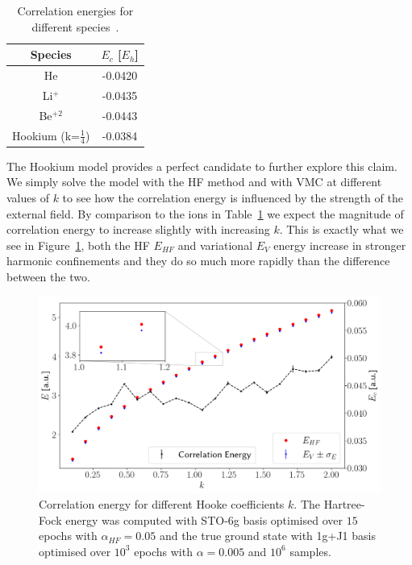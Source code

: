 \documentclass[final,3p,times,twocolumn]{elsarticle}
\begin{document}
	\begin{table}[h]
		\centering
		\begin{tabular}{@{}cc@{}} 
			\toprule
			Species &  $E_c $ [$E_h$] \\ \midrule
			He			& -0.0420 \\
			Li$^+$		& -0.0435 \\
			Be$^{+2}$	& -0.0443 \\
			Hookium	(k=$\frac{1}{4}$)	& -0.0384 \\
			\bottomrule
		\end{tabular}
		\caption{\label{tab:corrs} Correlation energies for different species~\cite{kais1993density}.}
	\end{table}
	The Hookium model provides a perfect candidate to further explore this claim. We simply solve the model with the HF method and with VMC at different values of $k$ to see how the correlation energy is influenced by the strength of the external field. By comparison to the ions in Table~\ref{tab:corrs} we expect the magnitude of correlation energy to increase slightly with increasing $k$. This is exactly what we see in Figure~\ref{fig:correng}, both the HF $E_{HF}$ and variational $E_V$ energy increase in stronger harmonic confinements and they do so much more rapidly than the difference between the two.
	\begin{figure}[h]
	\centering
	\includegraphics[width=\linewidth]{../plots/corrPlot.png}
	\caption{Correlation energy for different Hooke coefficients $k$. The Hartree-Fock energy was computed with STO-6g basis optimised over $15$ epochs with $\alpha_{HF} = 0.05$ and the true ground state with 1g+J1 basis optimised over $10^3$ epochs with $\alpha=0.005$ and $10^6$ samples.}
	\label{fig:correng}
	\end{figure}
\end{document}
